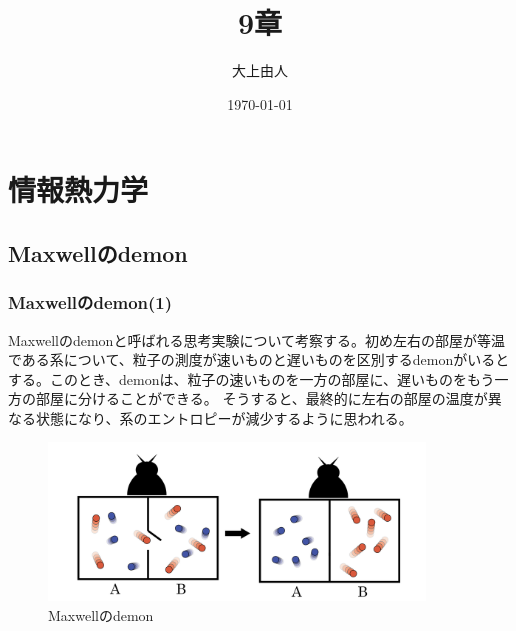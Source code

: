 \documentclass[a4paper,11pt]{jsarticle}
\numberwithin{equation}{section}
\begin{document}
\title{9章}
\author{大上由人}
\date{\today}
\maketitle

\setcounter{section}{8}
\section{情報熱力学}
\subsection{Maxwellのdemon}
\subsubsection{Maxwellのdemon(1)}
Maxwellのdemonと呼ばれる思考実験について考察する。初め左右の部屋が等温である系について、粒子の測度が速いものと遅いものを区別するdemonがいるとする。このとき、demonは、粒子の速いものを一方の部屋に、遅いものをもう一方の部屋に分けることができる。
そうすると、最終的に左右の部屋の温度が異なる状態になり、系のエントロピーが減少するように思われる。
\begin{figure}[H]
    \begin{center}
    \includegraphics[width=100mm]{demon.png}
    \end{center}
    \caption{Maxwellのdemon}
    \label{fig:Maxwelldemon}
\end{figure}
\end{document}

